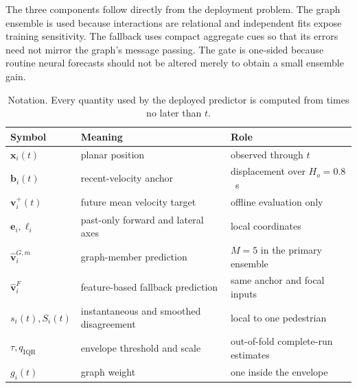\documentclass[preprint,11pt,authoryear]{elsarticle}
\begin{document}
The three components follow directly from the deployment problem. The graph ensemble is used because interactions are relational and independent fits expose training sensitivity. The fallback uses compact aggregate cues so that its errors need not mirror the graph's message passing. The gate is one-sided because routine neural forecasts should not be altered merely to obtain a small ensemble gain.

\begin{table}[!htbp]
\centering
\caption{Notation. Every quantity used by the deployed predictor is computed from times no later than $t$.}
\label{tab:notation}
\small
\renewcommand{\arraystretch}{1.08}
\begin{tabularx}{\textwidth}{>{\raggedright\arraybackslash}p{}X>{\raggedright\arraybackslash}p{}}
\toprule
Symbol & Meaning & Role \\
\midrule
$\mathbf x_i(t)$ & planar position & observed through $t$ \\
$\mathbf b_i(t)$ & recent-velocity anchor & displacement over $H_o=0.8$~s \\
$\mathbf v_i^+(t)$ & future mean velocity target & offline evaluation only \\
$\mathbf e_i,\boldsymbol\ell_i$ & past-only forward and lateral axes & local coordinates \\
$\widehat{\mathbf v}^{G,m}_i$ & graph-member prediction & $M=5$ in the primary ensemble \\
$\widehat{\mathbf v}^{F}_i$ & feature-based fallback prediction & same anchor and focal inputs \\
$s_i(t),S_i(t)$ & instantaneous and smoothed disagreement & local to one pedestrian \\
$\tau,q_{\mathrm{IQR}}$ & envelope threshold and scale & out-of-fold complete-run estimates \\
$g_i(t)$ & graph weight & one inside the envelope \\
\bottomrule
\end{tabularx}
\end{table}
\end{document}
